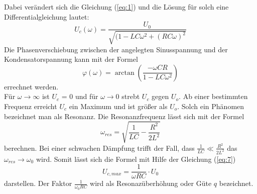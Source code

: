 Dabei verändert sich die Gleichung (\ref{eq:1}) und die Lösung für solch eine Differentialgleichung lautet:
\begin{equation}
  U_c(\omega) = \frac{U_0}{\sqrt{(1-LC\omega^2 + (RC\omega)^2}}
  \label{eq:5}
\end{equation}
Die Phasenverschiebung zwischen der angelegten Sinusspannung und der Kondensatorspannung kann mit der Formel
\begin{equation}
\varphi(\omega) = \arctan(\frac{-\omega CR}{1-LC\omega^2})
\label{eq:4}
\end{equation}
errechnet werden.\\
Für $\omega \rightarrow \infty$ ist $U_c$ = 0 und für $\omega \rightarrow 0$ strebt $U_c$ gegen $U_o$.
Ab einer bestimmten Frequenz erreicht $U_c$
ein Maximum und ist größer als $U_o$.
Solch ein Phänomen bezeichnet man als Resonanz.
Die Resonanzfrequenz lässt sich mit der Formel
\begin{equation}
  \omega_{res} = \sqrt{\frac{1}{LC} - \frac{R^2}{2L^2}}
  \label{eq:7}
\end{equation}
berechnen.
Bei einer schwachen Dämpfung trifft der Fall, dass $\frac{1}{LC} \ll \frac{R^2}{2L^2}$ das $\omega_{res} \rightarrow \omega_0$ wird.
Somit lässt sich die Formel mit Hilfe der Gleichung (\ref{eq:7})
\begin{equation}
  U_{c,max} = \frac{1}{\omega RC} \cdot U_0
\end{equation}
darstellen. Der Faktor $\frac{1}{\omega_0 RC}$ wird als Resonazüberhöhung oder Güte $q$ bezeichnet.

